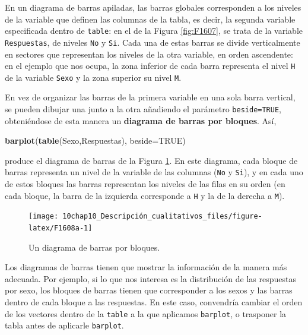 \documentclass[
]{book}
\newenvironment{Shaded}{\begin{snugshade}}{\end{snugshade}}
\newcommand{\DataTypeTok}[1]{\textcolor[rgb]{0.13,0.29,0.53}{#1}}
\newcommand{\KeywordTok}[1]{\textcolor[rgb]{0.13,0.29,0.53}{\textbf{#1}}}
\newcommand{\NormalTok}[1]{#1}
\newcommand{\OtherTok}[1]{\textcolor[rgb]{0.56,0.35,0.01}{#1}}
\theoremstyle{definition}
\theoremstyle{definition}
\theoremstyle{definition}
\theoremstyle{remark}
\begin{document}
En un diagrama de barras apiladas, las barras globales corresponden a los niveles de la variable que definen las columnas de la tabla, es decir, la segunda variable especificada dentro de \texttt{table}: en el de la Figura \ref{fig:F1607}, se trata de la variable \texttt{Respuestas}, de niveles \texttt{No} y \texttt{Si}. Cada una de estas barras se divide verticalmente en sectores que representan los niveles de la otra variable, en orden ascendente: en el ejemplo que nos ocupa, la zona inferior de cada barra representa el nivel \texttt{H} de la variable \texttt{Sexo} y la zona superior su nivel \texttt{M}.

En vez de organizar las barras de la primera variable en una sola barra vertical, se pueden dibujar una junto a la otra añadiendo el parámetro \texttt{beside=TRUE}, obteniéndose de esta manera un \textbf{diagrama de barras por bloques}. Así,

\begin{Shaded}
\begin{Highlighting}[]
\KeywordTok{barplot}\NormalTok{(}\KeywordTok{table}\NormalTok{(Sexo,Respuestas), }\DataTypeTok{beside=}\OtherTok{TRUE}\NormalTok{)}
\end{Highlighting}
\end{Shaded}

produce el diagrama de barras de la Figura \ref{fig:F1608a}.
En este diagrama, cada bloque de barras representa un nivel de la variable de las columnas (\texttt{No} y \texttt{Si}), y en cada uno de estos bloques las barras representan los niveles de las filas en su orden (en cada bloque, la barra de la izquierda corresponde a \texttt{H} y la de la derecha a \texttt{M}).

\begin{figure}

{\centering \texttt{[image: 10chap10\_Descripción\_cualitativos\_files/figure-latex/F1608a-1]} 

}

\caption{Un diagrama de barras por bloques.}\label{fig:F1608a}
\end{figure}

Los diagramas de barras tienen que mostrar la información de la manera más adecuada. Por ejemplo, si lo que nos interesa es la distribución de las respuestas por sexo, los bloques de barras tienen que corresponder a los sexos y las barras dentro de cada bloque a las respuestas. En este caso, convendría cambiar el orden de los vectores dentro de la \texttt{table} a la que aplicamos \texttt{barplot}, o trasponer la tabla antes de aplicarle \texttt{barplot}.
\end{document}
